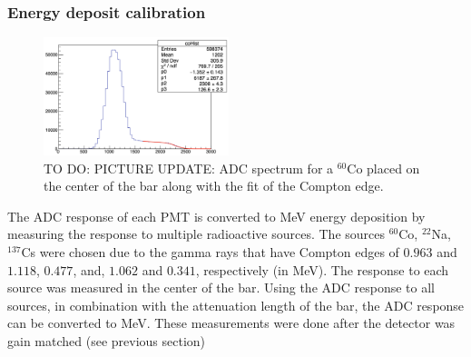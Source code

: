\documentclass[3p,final,twocolumn]{elsarticle}
\begin{document}
\subsubsection{Energy deposit calibration}
\label{sec:energydeposit}
\begin{figure}[tbh]
	\centering
		\includegraphics[width=0.48\textwidth]{co-compton.png}
		\caption{TO DO: PICTURE UPDATE: ADC spectrum for a $^{60}$Co placed on the center of the bar along with the fit of the Compton edge.}
	\label{fig:compton_edge}
\end{figure}


The ADC response of each PMT is converted to \si{\mega\electronvolt} energy deposition by measuring the response to 
multiple radioactive sources. The sources $^{60}$Co, $^{22}$Na, $^{137}$Cs were chosen due to the gamma rays that have 
Compton edges of $0.963$ and $1.118$, $0.477$, and, $1.062$ and $0.341$, respectively (in \si{\mega\electronvolt}). The 
response to each source was measured in the center of the bar. Using the ADC response to all sources, in combination with the 
attenuation length of the bar, the ADC response can be converted to \si{\mega\electronvolt}. These measurements were done after the detector was gain matched (see previous section)
\end{document}
